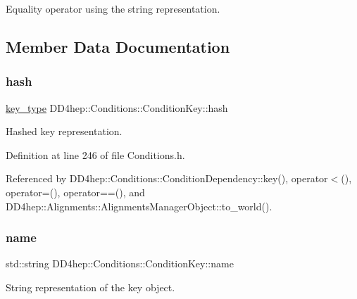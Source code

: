 Equality operator using the string representation. 



\subsection{Member Data Documentation}
\hypertarget{class_d_d4hep_1_1_conditions_1_1_condition_key_a6eb2b4ac135f9ca4e35737a4d64c16b3}{}\label{class_d_d4hep_1_1_conditions_1_1_condition_key_a6eb2b4ac135f9ca4e35737a4d64c16b3} 
\subsubsection{\texorpdfstring{hash}{hash}}
{\footnotesize\ttfamily \hyperlink{class_d_d4hep_1_1_conditions_1_1_condition_key_a08bfc8ccb807bdd5e4d9f3b065d1c8f5}{key\+\_\+type} D\+D4hep\+::\+Conditions\+::\+Condition\+Key\+::hash}



Hashed key representation. 



Definition at line 246 of file Conditions.\+h.



Referenced by D\+D4hep\+::\+Conditions\+::\+Condition\+Dependency\+::key(), operator$<$(), operator=(), operator==(), and D\+D4hep\+::\+Alignments\+::\+Alignments\+Manager\+Object\+::to\+\_\+world().

\hypertarget{class_d_d4hep_1_1_conditions_1_1_condition_key_a37729a238b66d69101805d98199544c1}{}\label{class_d_d4hep_1_1_conditions_1_1_condition_key_a37729a238b66d69101805d98199544c1} 
\subsubsection{\texorpdfstring{name}{name}}
{\footnotesize\ttfamily std\+::string D\+D4hep\+::\+Conditions\+::\+Condition\+Key\+::name}



String representation of the key object. 



